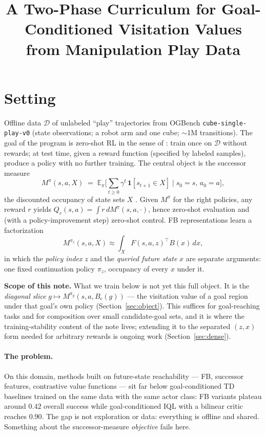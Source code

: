 \documentclass[10pt]{article}
\title{A Two-Phase Curriculum for Goal-Conditioned Visitation Values\\ from Manipulation Play Data}
\author{}
\date{}
\newcommand{\E}{\mathbb{E}}
\newcommand{\ind}[1]{\mathbf{1}\!\left[#1\right]}
\begin{document}
\maketitle


\section{Setting}

Offline data $\mathcal{D}$ of unlabeled ``play'' trajectories from OGBench \texttt{cube-single-play-v0} \citep{park2024ogbench} (state observations; a robot arm and one cube; $\sim$1M transitions).
The goal of the program is zero-shot RL in the sense of \citet{touati2021learning,touati2023does}: train once on $\mathcal{D}$ without rewards; at test time, given a reward function (specified by labeled samples), produce a policy with no further training.
The central object is the successor measure
\[
M^{\pi}(s,a,X) \;=\; \E_{\pi}\Big[\textstyle\sum_{t\ge 0}\gamma^{t}\,\ind{s_{t+1}\in X}\;\Big|\;s_{0}=s,\,a_{0}=a\Big],
\]
the discounted occupancy of state sets $X$ \citep{dayan1993improving,blier2021learning}.
Given $M^{\pi}$ for the right policies, any reward $r$ yields
$Q_r(s,a)=\int r\,dM^{\pi}(s,a,\cdot)$, hence zero-shot evaluation and (with a policy-improvement step) zero-shot control.
FB representations \citep{touati2021learning} learn a factorization
\[
M^{\pi_z}(s,a,X) \approx \int_X F(s,a,z)^{\top}B(x)\,dx,
\]
in which the \emph{policy index} $z$ and the \emph{queried future state} $x$ are separate
arguments: one fixed continuation policy $\pi_z$, occupancy of every $x$ under it.

\textbf{Scope of this note.} What we train below is not yet this full object.
It is the \emph{diagonal slice} $g \mapsto M^{\pi_g}(s,a,B_\epsilon(g))$ --- the visitation
value of a goal region under that goal's own policy (Section~\ref{sec:object}).
This suffices for goal-reaching tasks and for composition over small candidate-goal sets,
and it is where the training-stability content of the note lives; extending it to the
separated $(z,x)$ form needed for arbitrary rewards is ongoing work
(Section~\ref{sec:dense}).

\paragraph{The problem.}
On this domain, methods built on future-state reachability --- FB, successor features, contrastive value functions --- sit far below goal-conditioned TD baselines trained on the same data with the same actor class: FB variants plateau around $0.42$ overall success while goal-conditioned IQL \citep{kostrikov2021offline} with a bilinear critic reaches $0.90$.
The gap is not exploration or data: everything is offline and shared.
Something about the successor-measure \emph{objective} fails here.
\end{document}
